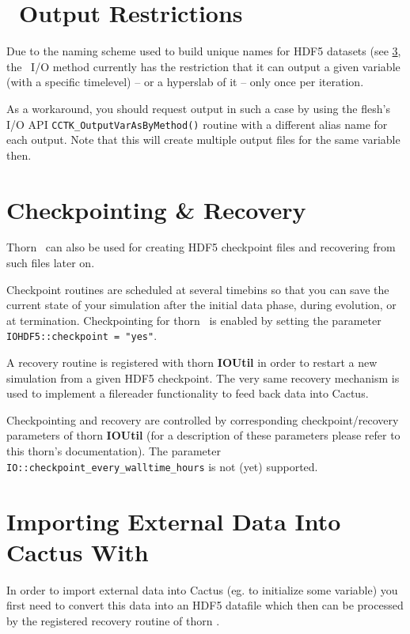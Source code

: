 \documentclass{article}
\begin{document}
\section{\ThisThorn\ Output Restrictions}

Due to the naming scheme used to build unique names for HDF5 datasets
(see \ref{IOHDF5_import_data}, the \ThisThorn\ I/O method currently has the
restriction that it can output a given variable (with a specific timelevel) --
or a hyperslab of it -- only once per iteration.

As a workaround, you should request output in such a case by using the
flesh's I/O API {\tt CCTK\_\-OutputVarAs\-ByMethod()} routine with a different
alias name for each output. Note that this will create multiple output files
for the same variable then.

\section{Checkpointing \& Recovery}

Thorn \ThisThorn\ can also be used for creating HDF5 checkpoint files and
recovering from such files later on.

Checkpoint routines are scheduled at several timebins so that you can save
the current state of your simulation after the initial data phase,
during evolution, or at termination. Checkpointing for thorn \ThisThorn\
is enabled by setting the parameter {\tt IOHDF5::checkpoint = "yes"}.

A recovery routine is registered with thorn {\bf IOUtil} in order to restart
a new simulation from a given HDF5 checkpoint.
The very same recovery mechanism is used to implement a filereader
functionality to feed back data into Cactus.

Checkpointing and recovery are controlled by corresponding checkpoint/recovery
parameters of thorn {\bf IOUtil} (for a description of these parameters please
refer to this thorn's documentation).  The parameter {\tt
  IO::checkpoint\_every\_walltime\_hours} is not (yet) supported.


\section{Importing External Data Into Cactus With \ThisThorn}
\label{IOHDF5_import_data}

In order to import external data into Cactus (eg. to initialize some variable)
you first need to convert this data into an HDF5 datafile which then can be
processed by the registered recovery routine of thorn \ThisThorn.
\end{document}
